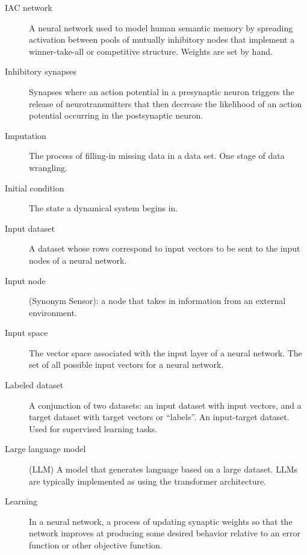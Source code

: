 \begin{description}
\item[IAC network] A neural network used to model human semantic memory by spreading activation between pools of mutually inhibitory nodes that implement a winner-take-all or competitive structure. Weights are set by hand. 

\item[Inhibitory synapses] Synapses where an action potential in a presynaptic neuron triggers the release of neurotransmitters that then decrease the likelihood of an action potential occurring in the postsynaptic neuron.

\item[Imputation] The process of filling-in missing data in a data set. One stage of data wrangling.

\item[Initial condition] The state a dynamical system begins in.

\item[Input dataset] A dataset whose rows correspond to input vectors to be sent to the input nodes of a neural network.

\item[Input node] (Synonym Sensor): a node that takes in information from an external environment. 

\item[Input space] The vector space associated with the input layer of a neural network. The set of all possible input vectors for a neural network.





\item[Labeled dataset] A conjunction of two datasets: an input dataset with input vectors, and a target dataset with target vectors or ``labels''. An input-target dataset. Used for supervised learning tasks.  

\item[Large language model] (LLM) A model that generates language based on a large dataset.  LLMs are typically implemented as using the transformer architecture.

\item[Learning] In a neural network, a process of updating synaptic weights so that the network improves at producing some desired behavior relative to an error function or other objective function.


\end{description}
